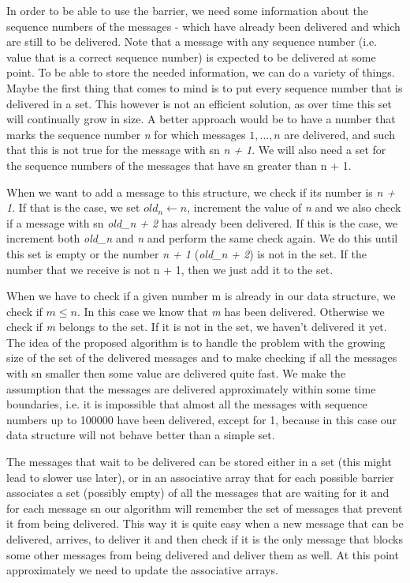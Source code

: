 \documentclass[12pt]{article}
\theoremstyle{plain}
\begin{document}
In order to be able to use the barrier, we need some information about the 
sequence numbers of the messages - which have already been delivered and which
are still to be delivered. Note that a message with any sequence number (i.e.
value that is a correct sequence number) is expected to be delivered at some
point. To be able to store the needed information, we can do a variety of things.
Maybe the first thing that comes to mind is to put every sequence number that is
delivered in a set. This however is not an efficient solution, as over time
this set will continually grow in size. A better approach would be to have a
number that marks the sequence number \emph{n} for which messages $1, \dots, n$
are delivered, and such that this is not true for the message with sn
\emph{n + 1}. We will also need a set for the sequence numbers of the messages
that have sn greater than n + 1.  

When we want to add a message to this structure, we check if its number is
\emph{n + 1}. If that is the case, we set $old_n \leftarrow n$, increment the
value of \emph{n} and we also check if a message with sn \emph{old\_n + 2} has
already been delivered. If this is the case, we increment both \emph{old\_n} and
\emph{n} and perform the same check again. We do this until this set is empty
or the number \emph{n + 1} (\emph{old\_n + 2}) is not in the set. If the number
that we receive is not n + 1, then we just add it to the set.  

When we have to check if a given number m is already in our data structure, we
check if $m \le n$. In this case we know that \emph{m} has been delivered.
Otherwise we check if \emph{m} belongs to the set. If it is not in the set, we
haven't delivered it yet.  The idea of the proposed algorithm is to handle the
problem with the growing size of the set of the delivered messages and to make
checking if all the messages with sn smaller then some value are delivered quite
fast. We make the assumption that the messages are delivered approximately
within some time boundaries, i.e. it is impossible that almost all the messages
with sequence numbers up to 100000 have been delivered, except for 1, because
in this case our data structure will not behave better than a simple set.

The messages that wait to be delivered can be stored either in a set (this
might lead to slower use later), or in an associative array that for each possible
barrier associates a set (possibly empty) of all the messages that are waiting
for it and for each message sn our algorithm will remember the set of messages
that prevent it from being delivered. This way it is quite easy when a new message
that can be delivered, arrives, to deliver it and then check if it is the only
message that blocks some other messages from being delivered and deliver them as
well. At this point approximately we need to update the associative arrays.
\end{document}

